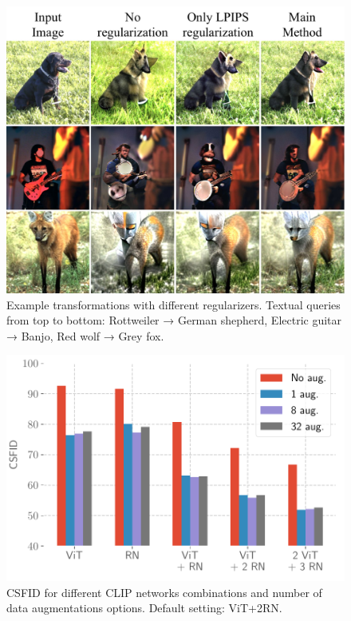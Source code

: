 \begin{figure}
    \centering
    \vspace{-1em}
    \includegraphics[width=\linewidth]{images/flexit/assets/demo_reg2.pdf}
    \caption{Example transformations with different regularizers. Textual queries from top to bottom: Rottweiler → German shepherd, Electric guitar → Banjo, Red wolf → Grey fox.
    }
    \label{fig:demo_reg}
\end{figure}


\begin{figure}
    \centering
    \vspace{-1em}
    \includegraphics[width=.9\linewidth]{images/flexit/assets/naug_nnets.pdf}
    \caption{CSFID for different CLIP networks combinations and number of data augmentations options. Default setting: ViT+2RN.}
    \label{fig:augs}
    \vspace{-1em}
\end{figure}


